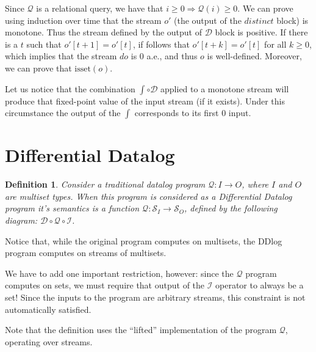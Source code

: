 \documentclass[10pt]{article}
\newtheorem{definition}{Definition}[section]
\newcommand{\stream}[1]{\ensuremath{\mathcal{S}_{#1}}}
\newcommand{\I}{\mathcal{I}}  %
\newcommand{\D}{\mathcal{D}}  %
\newcommand{\distinct}{\mathit{distinct}}  %
\newcommand{\q}{\ensuremath{\mathcal{Q}}}  %
\newcommand{\isset}{\mbox{isset}}
\begin{document}
Since $\q$ is a relational query, we have that $i \geq 0 \Rightarrow
\q(i) \geq 0$.  We can prove using induction over time that the stream
$o'$ (the output of the $\distinct$ block) is monotone.  Thus the
stream defined by the output of $\D$ block is positive.  If there is a
$t$ such that $o'[t + 1] = o'[t]$, if follows that $o'[t + k] = o'[t]$
for all $k \geq 0$, which implies that the stream $do$ is 0 a.e., and
thus $o$ is well-defined.  Moreover, we can prove that $\isset(o)$.

Let us notice that the combination $\int \circ \D$ applied to a
monotone stream will produce that fixed-point value of the input
stream (if it exists).  Under this circumstance the output of the
$\int$ corresponds to its first $0$ input.

\section{Differential Datalog}

\begin{definition}
Consider a traditional datalog program $\q: I \rightarrow O$, where
$I$ and $O$ are multiset types.  When this program is considered as a
Differential Datalog program it's semantics is a function $\q:
\stream{I} \rightarrow \stream{O}$, defined by the following diagram:
$\D \circ \q \circ \I$.
\end{definition}

Notice that, while the original program computes on multisets, the
DDlog program computes on streams of multisets.

We have to add one important restriction, however: since the $\q$
program computes on sets, we must require that output of the $\I$
operator to always be a set!  Since the inputs to the program are
arbitrary streams, this constraint is not automatically satisfied.


Note that the definition uses the ``lifted'' implementation of the
program $\q$, operating over streams.
\end{document}
